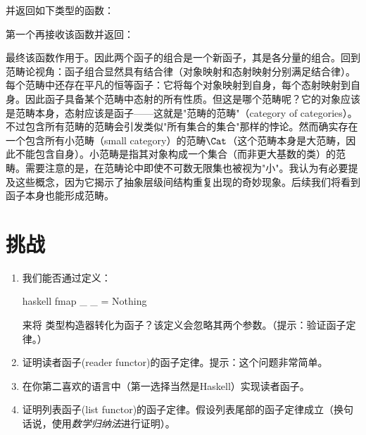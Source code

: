 并返回如下类型的函数：

第一个再接收该函数并返回：

最终该函数作用于。因此两个函子的组合是一个新函子，其是各分量的组合。回到范畴论视角：函子组合显然具有结合律（对象映射和态射映射分别满足结合律）。每个范畴中还存在平凡的恒等函子：它将每个对象映射到自身，每个态射映射到自身。因此函子具备某个范畴中态射的所有性质。但这是哪个范畴呢？它的对象应该是范畴本身，态射应该是函子——这就是"范畴的范畴"（category of categories）。不过包含所有范畴的范畴会引发类似"所有集合的集合"那样的悖论。然而确实存在一个包含所有小范畴（small category）的范畴$\Cat$（这个范畴本身是大范畴，因此不能包含自身）。小范畴是指其对象构成一个集合（而非更大基数的类）的范畴。需要注意的是，在范畴论中即使不可数无限集也被视为"小"。我认为有必要提及这些概念，因为它揭示了抽象层级间结构重复出现的奇妙现象。后续我们将看到函子本身也能形成范畴。

\section{挑战}

\begin{enumerate}
  \tightlist
  \item
        我们能否通过定义：

        \begin{snip}{haskell}
fmap _ _ = Nothing
\end{snip}

        来将  类型构造器转化为函子？该定义会忽略其两个参数。（提示：验证函子定律。）
  \item
        证明读者函子(reader functor)的函子定律。提示：这个问题非常简单。
  \item
        在你第二喜欢的语言中（第一选择当然是Haskell）实现读者函子。
  \item
        证明列表函子(list functor)的函子定律。假设列表尾部的函子定律成立（换句话说，使用\emph{数学归纳法}进行证明）。
\end{enumerate}